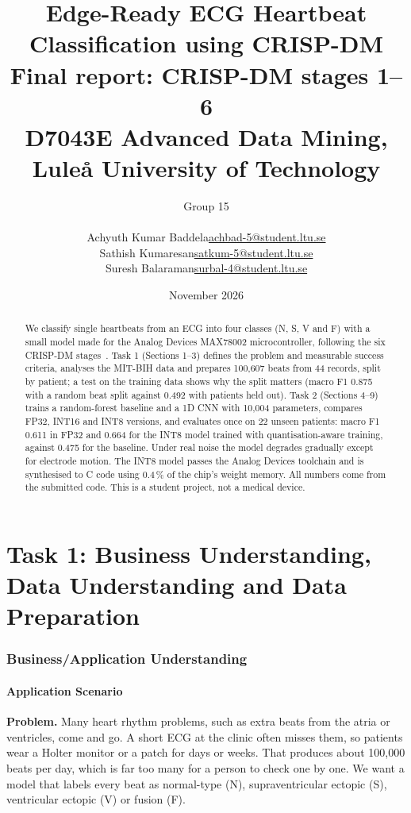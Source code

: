 \documentclass[11pt,a4paper]{article}
\title{\textbf{Edge-Ready ECG Heartbeat Classification using CRISP-DM}\\[6pt]
\large Final report: CRISP-DM stages 1--6\\[4pt]
\normalsize D7043E Advanced Data Mining, Lule\aa{} University of Technology}
\author{Group 15\\[6pt]
\begin{tabular}{l l}
Achyuth Kumar Baddela & \href{mailto:achbad-5@student.ltu.se}{achbad-5@student.ltu.se}\\
Sathish Kumaresan & \href{mailto:satkum-5@student.ltu.se}{satkum-5@student.ltu.se}\\
Suresh Balaraman & \href{mailto:surbal-4@student.ltu.se}{surbal-4@student.ltu.se}
\end{tabular}}
\date{November 2026}
\begin{document}
\maketitle

\begin{abstract}
\noindent
We classify single heartbeats from an ECG into four classes (N, S, V and F) with a small model made for the Analog Devices MAX78002 microcontroller, following the six CRISP-DM stages~\citep{chapman2000crisp,wirth2000crisp}. Task 1 (Sections 1--3) defines the problem and measurable success criteria, analyses the MIT-BIH data and prepares 100,607 beats from 44 records, split by patient; a test on the training data shows why the split matters (macro F1 0.875 with a random beat split against 0.492 with patients held out). Task 2 (Sections 4--9) trains a random-forest baseline and a 1D CNN with 10,004 parameters, compares FP32, INT16 and INT8 versions, and evaluates once on 22 unseen patients: macro F1 0.611 in FP32 and 0.664 for the INT8 model trained with quantisation-aware training, against 0.475 for the baseline. Under real noise the model degrades gradually except for electrode motion. The INT8 model passes the Analog Devices toolchain and is synthesised to C code using 0.4\,\% of the chip's weight memory. All numbers come from the submitted code. This is a student project, not a medical device.
\end{abstract}

{\small\tableofcontents}
\newpage

\part*{Task 1: Business Understanding, Data Understanding and Data Preparation}

\section{Business/Application Understanding}

\subsection{Application Scenario}

\textbf{Problem.} Many heart rhythm problems, such as extra beats from the atria or ventricles, come and go. A short ECG at the clinic often misses them, so patients wear a Holter monitor or a patch for days or weeks. That produces about 100,000 beats per day, which is far too many for a person to check one by one. We want a model that labels every beat as normal-type (N), supraventricular ectopic (S), ventricular ectopic (V) or fusion (F).
\end{document}
